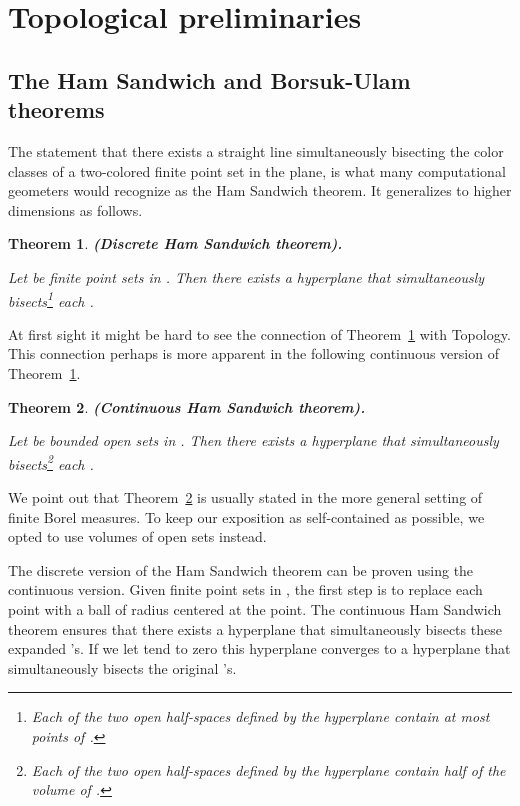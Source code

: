 \documentclass{article}
\newtheorem{theorem}{Theorem}
\begin{document}
\section{Topological preliminaries}\label{sec:topo}

\subsection{The Ham Sandwich and Borsuk-Ulam theorems}\label{sec:ham}

The statement that there exists a straight line simultaneously
bisecting the color classes of a two-colored finite point
set in the plane, is what many computational geometers would
recognize as the Ham Sandwich theorem. It generalizes
to higher dimensions as follows.

\begin{theorem} \textbf{(Discrete Ham Sandwich theorem).} \label{thm:ham_d}

Let  be finite point sets in .
Then there exists a hyperplane that simultaneously bisects\footnote{Each of the two open half-spaces defined
by the hyperplane contain at most  points
of  . } each .
\end{theorem}

At first sight it might be hard to see the connection
of Theorem~\ref{thm:ham_d} with Topology. This connection
perhaps is more apparent in the following continuous version of Theorem~\ref{thm:ham_d}.

\begin{theorem} \textbf{(Continuous Ham Sandwich theorem).} \label{thm:ham_c}

Let  be bounded open sets in .
Then there exists a hyperplane that simultaneously bisects\footnote{Each of the two open half-spaces defined
by the hyperplane contain half of the volume of .} each .
\end{theorem}

We point out that Theorem~\ref{thm:ham_c} is usually
stated in the more general setting of finite Borel measures. To keep our 
exposition as self-contained as possible, we opted to use volumes
of open sets instead. 

The discrete version of the Ham Sandwich theorem can be proven using the 
continuous version. Given  
finite point sets in , the first step
is to replace each point with a ball of radius 
centered at the point. The continuous Ham Sandwich theorem ensures that 
there exists a hyperplane that simultaneously bisects
these expanded 's. If we let  tend to zero this hyperplane
converges to a hyperplane that simultaneously bisects the original 's.
\end{document}
